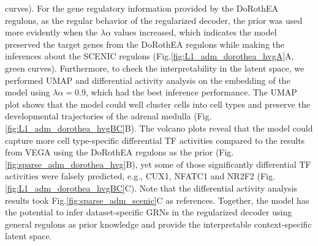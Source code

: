 curves). For the gene regulatory information provided by the DoRothEA regulons, as the regular behavior of the regularized decoder, the prior was used more evidently when the $\lambda\alpha$ values increased, which indicates the model preserved the target genes from the DoRothEA regulons while making the inferences about the SCENIC regulons (Fig.\ref{fig:L1_adm_dorothea_hvgA}A, green curves). Furthermore, to check the interpretability in the latent space, we performed UMAP and differential activity analysis on the embedding of the model using $\lambda\alpha = 0.9$, which had the best inference performance. The UMAP plot shows that the model could well cluster cells into cell types and preserve the developmental trajectories of the adrenal medulla (Fig.\ref{fig:L1_adm_dorothea_hvgBC}B). The volcano plots reveal that the model could capture more cell type-specific differential TF activities compared to the results from VEGA using the DoRothEA regulons as the prior (Fig.\ref{fig:sparse_adm_dorothea_hvg}B), yet some of those significantly differential TF activities were falsely predicted, e.g., CUX1, NFATC1 and NR2F2 (Fig.\ref{fig:L1_adm_dorothea_hvgBC}C). Note that the differential activity analysis results took Fig.\ref{fig:sparse_adm_scenic}C as references. Together, the model has the potential to infer dataset-specific GRNs in the regularized decoder using general regulons as prior knowledge and provide the interpretable context-specific latent space.

